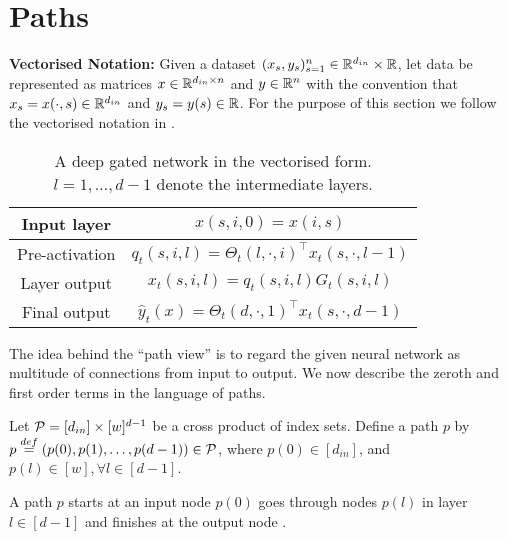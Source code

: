 \section{Paths}\label{sec:path}
\textbf{Vectorised Notation:} Given a dataset $(x_s,y_s)_{s=1}^n\in \R^{d_{in}}\times \R$, let data be represented as matrices $x\in\R^{d_{in}\times n}$ and $y\in \R^n$ with the convention that $x_s=x(\cdot,s)\in\R^{d_{in}}$ and $y_s=y(s)\in \R$. For the purpose of this section we follow the vectorised notation in .

\FloatBarrier
\begin{table}[h]
\centering
\begin{tabular}{|c|c|}\hline
Input layer & $x(s,i,0) =x(i,s)$ \\\hline
Pre-activation& $q_t(s,i,l)= {\Theta_t(l,\cdot,i)}^\top x_t(s,\cdot,l-1) $ \\\hline
Layer output & $x_t(s,i,l)= q_t(s,i,l) G_t(s,i,l)$ \\\hline
Final output & $\hat{y}_t(x)={\Theta_t(d,\cdot,1)}^\top x_t(s,\cdot,d-1)$\\\hline
\end{tabular}
\caption{A deep gated network in the vectorised form. $l=1,\ldots,d-1$ denote the intermediate layers.}
\label{tb:dgnvector}
\end{table}




The idea behind the ``path view'' is to regard the given neural network as multitude of connections from input to output.  We now describe the zeroth and first order terms in the language of paths.
\begin{definition}
Let $\P=[d_{in}]\times [w]^{d-1}$ be a cross product of index sets. Define a path $p$ by $p\stackrel{def}=(p(0),p(1),\ldots,p(d-1))\in \P$, where $p(0)\in [d_{in}]$, and $p(l)\in[w],\forall l\in[d-1]$. 
\end{definition}

A path $p$ starts at an input node $p(0)$ goes through nodes $p(l)$ in layer $l\in[d-1]$ and finishes at the output node .%

